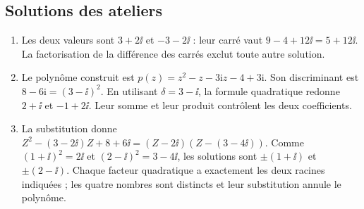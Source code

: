 \subsection{Solutions des ateliers}
\begin{enumerate}
\item Les deux valeurs sont $3+2\ii$ et $-3-2\ii$ : leur carré vaut $9-4+12\ii=5+12\ii$. La factorisation de la différence des carrés exclut toute autre solution.
\item Le polynôme construit est $p(z)=z^{2} - z - 3 \mathrm{i} z - 4 + 3 \mathrm{i}$. Son discriminant est $8 - 6 \mathrm{i}=(3-\ii)^2$. En utilisant $\delta=3-\ii$, la formule quadratique redonne $2+\ii$ et $-1+2\ii$. Leur somme et leur produit contrôlent les deux coefficients.
\item La substitution donne $Z^2-(3-2\ii)Z+8+6\ii=(Z-2\ii)(Z-(3-4\ii))$. Comme $(1+\ii)^2=2\ii$ et $(2-\ii)^2=3-4\ii$, les solutions sont $\pm(1+\ii)$ et $\pm(2-\ii)$. Chaque facteur quadratique a exactement les deux racines indiquées ; les quatre nombres sont distincts et leur substitution annule le polynôme.
\end{enumerate}
